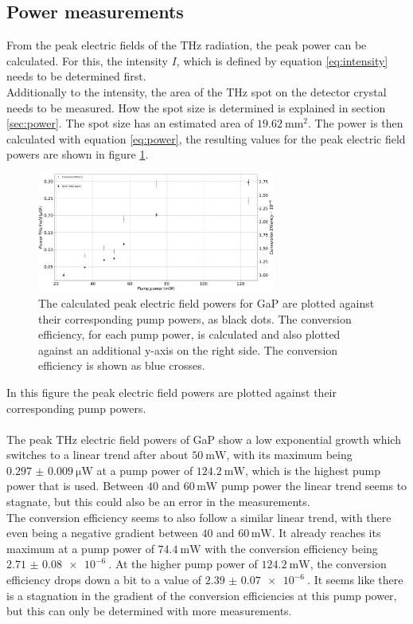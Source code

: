 \subsection{Power measurements}
From the peak electric fields of the $\si{\tera\hertz}$ radiation, the peak power can be calculated.
For this, the intensity $I$, which is defined by equation \eqref{eq:intensity} needs to be determined first.
\\
Additionally to the intensity, the area of the $\si{\tera\hertz}$ spot on the detector crystal needs to be measured.
How the spot size is determined is explained in section \ref{sec:power}.
The spot size has an estimated area of $\SI{19.62}{\milli\meter\squared}$.
The power is then calculated with equation \eqref{eq:power}, the resulting values for the peak electric field powers are shown in figure \ref{fig:gap_power}.
\begin{figure}
    \centering
    \includegraphics[width=0.7\textwidth]{Plots/Powergap.pdf}
    \caption{The calculated peak electric field powers for GaP are plotted against their corresponding pump powers, as black dots.
    The conversion efficiency, for each pump power, is calculated and also plotted against an additional y-axis on the right side.
    The conversion efficiency is shown as blue crosses.}
    \label{fig:gap_power}
\end{figure}
In this figure the peak electric field powers are plotted against their corresponding pump powers.
\\\\
The peak $\si{\tera\hertz}$ electric field powers of GaP show a low exponential growth which switches to a linear trend after about $\SI{50}{\milli\W}$, with its maximum being $\SI{0.297(9)}{\micro\W}$ at a pump power of $\SI{124.2}{\milli\W}$, which is the highest pump power that is used.
Between $40$ and $60 \, \si{\milli\W}$ pump power the linear trend seems to stagnate, but this could also be an error in the measurements.
\\
The conversion efficiency seems to also follow a similar linear trend, with there even being a negative gradient between  $40$ and $60 \, \si{\milli\W}$.
It already reaches its maximum at a pump power of $\SI{74.4}{\milli\W}$ with the conversion efficiency being $\SI{2.71(8)e-6}{}$.
At the higher pump power of $\SI{124.2}{\milli\W}$, the conversion efficiency drops down a bit to a value of $\SI{2.39(7)e-6}{}$.
It seems like there is a stagnation in the gradient of the conversion efficiencies at this pump power, but this can only be determined with more measurements.
\FloatBarrier

